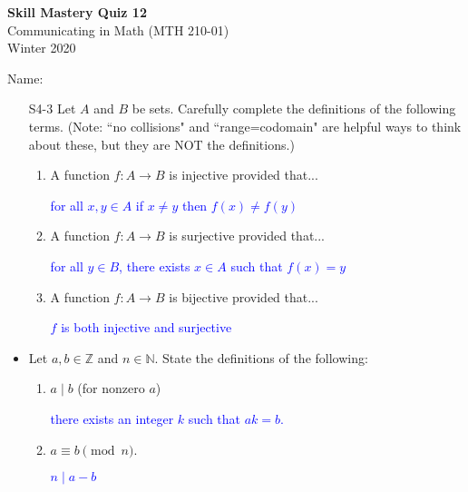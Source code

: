 \documentclass[10pt]{article}
\newcommand{\Z}{\mathbb{Z}}
\newcommand{\N}{\mathbb{N}}
\newcommand{\blue}{\textcolor{blue}}
\newcommand{\bs}{\begin{solution}}
\begin{document}
\vspace{-1.2in}
\begin{center} \textbf{\Large{Skill Mastery Quiz 12}} \\
Communicating in Math (MTH 210-01)\\
Winter 2020
\end{center}



\noindent Name: 




\begin{itemize}
	





\item[S4-3] Let $A$ and $B$ be sets. Carefully complete the definitions of the following terms. (Note: ``no collisions" and ``range=codomain" are helpful ways to think about these, but they are NOT the definitions.)
		\begin{enumerate}
		\item  A function $f: A \to B$ is injective provided that...
		\bs\blue{for all $x,y\in A$ if $x\neq y$ then $f(x) \neq f(y)$}\end{solution}
		\vspace{1in}
		\item A function $f: A\to B$ is surjective provided that...
		\bs \blue{for all $y\in B$, there exists $x\in A$ such that $f(x)=y$}\end{solution}
		\vspace{1in}
		\item A function $f: A\to B$ is bijective provided that...
		\bs\blue{$f$ is both injective and surjective}\end{solution}
		\vspace{1in}
		\end{enumerate}


\item[S6-3] Let $a,b\in\Z$ and $n\in\N$. State the definitions of the following:
\begin{enumerate}
\item $a\mid b$ (for nonzero $a$) \bs\blue{there exists an integer $k$ such that $ak=b$.}\end{solution}
\vspace{.5in}
\item  $a \equiv b\pmod{n}$.  
\bs\blue{$n\mid a-b$}\end{solution}
\vspace{.5in}
\end{enumerate}


\end{itemize}
\end{document}
